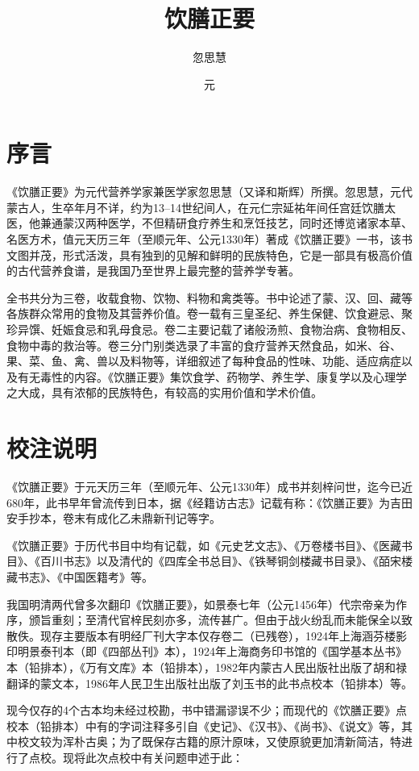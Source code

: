 \documentclass[12pt,UTF8]{ctexbook}
\title{\heiti\zihao{0} 饮膳正要}
\author{忽思慧}
\date{元}
\begin{document}
\maketitle
\tableofcontents

\frontmatter
\chapter{序言}

《饮膳正要》为元代营养学家兼医学家忽思慧（又译和斯辉）所撰。忽思慧，元代蒙古人，生卒年月不详，约为13--14世纪间人，在元仁宗延祐年间任宫廷饮膳太医，他兼通蒙汉两种医学，不但精研食疗养生和烹饪技艺，同时还博览诸家本草、名医方术，值元天历三年（至顺元年、公元1330年）著成《饮膳正要》一书，该书文图并茂，形式活泼，具有独到的见解和鲜明的民族特色，它是一部具有极高价值的古代营养食谱，是我国乃至世界上最完整的营养学专著。

全书共分为三卷，收载食物、饮物、料物和禽类等。书中论述了蒙、汉、回、藏等各族群众常用的食物及其营养价值。卷一载有三皇圣纪、养生保健、饮食避忌、聚珍异馔、妊娠食忌和乳母食忌。卷二主要记载了诸般汤煎、食物治病、食物相反、食物中毒的救治等。卷三分门别类选录了丰富的食疗营养天然食品，如米、谷、果、菜、鱼、禽、兽以及料物等，详细叙述了每种食品的性味、功能、适应病症以及有无毒性的内容。《饮膳正要》集饮食学、药物学、养生学、康复学以及心理学之大成，具有浓郁的民族特色，有较高的实用价值和学术价值。

\chapter{校注说明}

《饮膳正要》于元天历三年（至顺元年、公元1330年）成书并刻梓问世，迄今已近680年，此书早年曾流传到日本，据《经籍访古志》记载有称：《饮膳正要》为吉田安手抄本，卷末有成化乙未鼎新刊记等字。

《饮膳正要》于历代书目中均有记载，如《元史艺文志》、《万卷楼书目》、《医藏书目》、《百川书志》以及清代的《四库全书总目》、《铁琴铜剑楼藏书目录》、《皕宋楼藏书志》、《中国医籍考》等。

我国明清两代曾多次翻印《饮膳正要》，如景泰七年（公元1456年）代宗帝亲为作序，颁旨重刻；至清代官梓民刻亦多，流传甚广。但由于战火纷乱而未能保全以致散佚。现存主要版本有明经厂刊大字本仅存卷二（已残卷），1924年上海涵芬楼影印明景泰刊本（即《四部丛刊》本），1924年上海商务印书馆的《国学基本丛书》本（铅排本），《万有文库》本（铅排本），1982年内蒙古人民出版社出版了胡和禄翻译的蒙文本，1986年人民卫生出版社出版了刘玉书的此书点校本（铅排本）等。

现今仅存的4个古本均未经过校勘，书中错漏谬误不少；而现代的《饮膳正要》点校本（铅排本）中有的字词注释多引自《史记》、《汉书》、《尚书》、《说文》等，其中校文较为浑朴古奥；为了既保存古籍的原汁原味，又使原貌更加清新简洁，特进行了点校。现将此次点校中有关问题申述于此：
\end{document}

